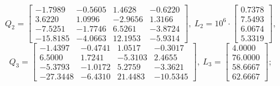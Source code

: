 \documentclass[a4paper, 12pt]{article}
\begin{document}
    $$
    Q_2=\begin{bmatrix}
    -1.7989   &-0.5605    &1.4628   &-0.6220\\
    3.6220    &1.0996   &-2.9656    &1.3166\\
   -7.5251   &-1.7746    &6.5261   &-3.8724\\
  -15.8185   &-4.0663   &12.1953   &-5.9314
    \end{bmatrix},\ L_2=10^6\cdot\begin{bmatrix}
        0.7378\\
    7.5493\\
    6.0674\\
    5.3319
    \end{bmatrix},
    $$
    $$
    Q_3=\begin{bmatrix}
    -1.4397   &-0.4741    &1.0517   &-0.3017\\
    6.5000    &1.7241   &-5.3103    &2.4655\\
   -5.3793   &-1.0172    &5.2759   &-3.3621\\
  -27.3448   &-6.4310   &21.4483  &-10.5345
    \end{bmatrix},\ L_3=\begin{bmatrix}
        4.0000\\
   76.0000\\
   58.6667\\
   62.6667
    \end{bmatrix};
    $$
\end{document}
